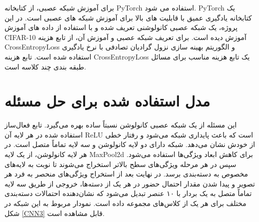 برای آموزش شبکه عصبی، از کتابخانه PyTorch استفاده می شود. PyTorch یک کتابخانه یادگیری عمیق با قابلیت های بالا برای آموزش شبکه های عصبی است. در این پروژه، یک شبکه عصبی کانولوشنی تعریف شده و با استفاده از داده های آموزش CIFAR-10 آموزش دیده است. 
برای تعریف شبکه عصبی و آموزش آن، از تابع هزینه CrossEntropyLoss و الگوریتم بهینه سازی نزول گرادیان تصادفی با نرخ یادگیری  استفاده شده است. تابع هزینه CrossEntropyLoss یک تابع هزینه مناسب برای مسائل طبقه بندی چند کلاسه است.


\section{مدل استفاده شده برای حل مسئله}

این مسئله از یک شبکه عصبی کانولوشن نسبتاً ساده بهره می‌گیرد. تابع فعال‌ساز استفاده شده در هر لایه آن ReLU است که باعث پایداری شبکه می‌شود و رفتار خطی از خودش نشان می‌دهد.
شبکه دارای دو لایه کانولوشن و سه لایه تماماً متصل است. در هر لایه کانولوشن، از یک لایه MaxPool2d برای کاهش ابعاد ویژگی‌ها استفاده می‌شود. سپس در هر مرحله ویژگی‌های سطح بالاتر استخراج می‌شوند تا نوبت به لایه‌های مخصوص به دسته‌بندی برسد. در نهایت بعد از استخراج ویژگی‌های منحصر به فرد هر تصویر و پیدا شدن مقدار احتمال حضور در هر یک از دسته‌ها، خروجی از طریق سه لایه تماماً متصل به یک بردار با ۱۰ عنصر تبدیل می‌شود که نشان‌دهنده احتمالات دسته‌بندی مختلف برای هر یک از کلاس‌های مجموعه داده است. نمودار مربوط به این شبکه در شکل \ref{CNN3} قابل مشاهده است.


